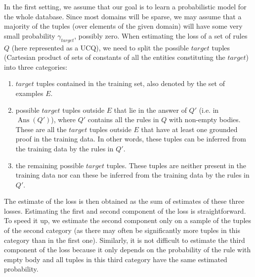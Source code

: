 \documentclass[akbc,twoside,11pt]{article}
\newcounter{example}
\newcommand{\ondrej}[1]{\textcolor{red}{O: {#1}}}
\begin{document}
In the first setting, we assume that our goal is to learn a probabilistic model for the whole database. Since most domains will be sparse, we may assume that a majority of the tuples (over elements of the given domain) will have some very small probability $\gamma_{\textit{target}}$, possibly zero. %
When estimating the loss of a set of rules $Q$ (here represented as a UCQ), we need to split the possible $target$ tuples (Cartesian product of sets of constants of all the entities constituting the $target$) into three categories: 
\begin{enumerate}
    \item $target$ tuples contained in the training set, also denoted by the set of examples $E$.
    \item possible $target$ tuples outside $E$ that lie in the answer of $Q'$ (i.e. in $\operatorname{Ans}(Q')$), where $Q'$ contains all the rules in $Q$ with non-empty bodies. These are all the $target$ tuples outside $E$ that have at least one grounded proof in the training data. In other words, these tuples can be inferred from the training data by the rules in $Q'$.
    \item the remaining possible $target$ tuples. These tuples are neither present in the training data nor can these be inferred from the training data by the rules in $Q'$.
\end{enumerate}
The estimate of the loss is then obtained as the sum of estimates of these three losses. Estimating the first and second component of the loss is straightforward. To speed it up, we estimate the second component only on a sample of the tuples of the second category (as there may often be significantly more tuples in this category than in the first one).
Similarly, it is not difficult to estimate the third component of the loss because it only depends on the probability of the rule with empty body and all tuples in this third category have the same estimated probability.
\end{document}
